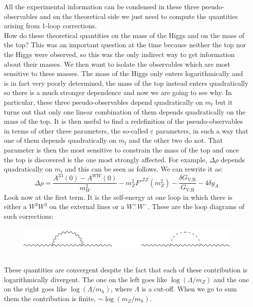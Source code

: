 \documentclass[../main.tex]{subfiles}
\begin{document}
All the experimental information can be condensed in these three pseudo-observables and on the theoretical side we just need to compute the quantities arising from 1-loop corrections.\\
How do these theoretical quantities on the mass of the Higgs and on the mass of the top? This was an important question at the time because neither the top nor the Higgs were observed, so this was the only indirect way to get information about their masses. We then want to isolate the observables which are most sensitive to these masses. The mass of the Higgs only enters logarithmically and is in fact very poorly determined, the mass of the top instead enters quadratically so there is a much stronger dependence and now we are going to see why. In particular, these three pseudo-observables depend quadratically on $m_t$ but it turns out that only one linear combination of them depends quadratically on the mass of the top. It is then useful to find a redefinition of the pseudo-observables in terms of other three parameters, the so-called $\varepsilon$ parameters, in such a way that one of them depends quadratically on $m_t$ and the other two do not. That parameter is then the most sensitive to constrain the mass of the top and once the top is discovered is the one most strongly affected. For example, $\Delta\rho$ depends quadratically on $m_t$ and this can be seen as follows. We can rewrite it as:
\[
\Delta\rho=\frac{A^{33}(0)-A^{WW}(0)}{m_W^2}-m_Z^2F'^{ZZ}(m_Z^2)-\frac{\delta G_{\text{V,B}}}{G_{\text{V,B}}}-4\delta g_A
\]
Look now at the first term. It is the self-energy at one loop in which there is either a $W^3W^3$ on the external lines or a $W^+W^-$. These are the loop diagrams of such corrections:
\begin{figure}[h]
    \centering
    \includegraphics{Images/loopcorr.pdf}
    \caption*{}
\end{figure}\\
These quantities are convergent despite the fact that each of these contribution is logarithmically divergent. The one on the left goes like $\log(\Lambda/m_Z)$ and the one on the right goes like $\log(\Lambda/m_h)$, where $\Lambda$ is a cut-off. When we go to sum them the contribution is finite, $\sim\log(m_Z/m_h)$.\\
\end{document}
